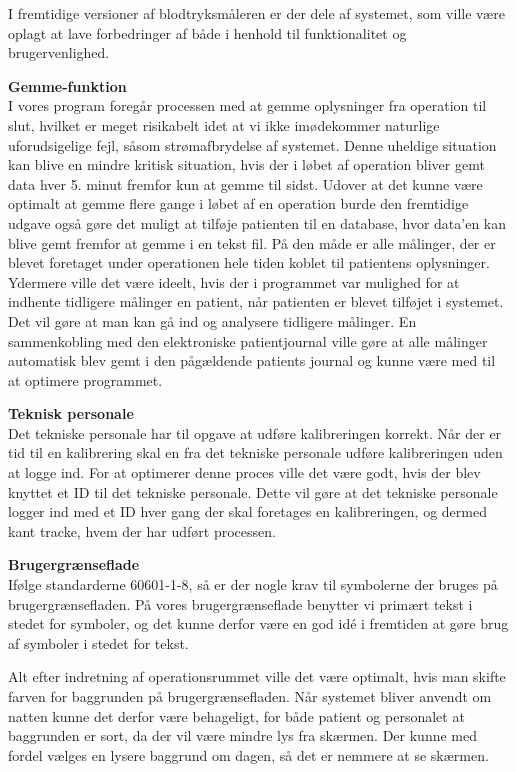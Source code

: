 I fremtidige versioner af blodtryksmåleren er der dele af systemet, som ville være oplagt at lave forbedringer af både i henhold til funktionalitet og brugervenlighed. 

\textbf{Gemme-funktion}
\\I vores program foregår processen med at gemme oplysninger fra operation til slut, hvilket er meget risikabelt idet at vi ikke imødekommer naturlige uforudsigelige fejl, såsom strømafbrydelse af systemet. Denne uheldige situation kan blive en mindre kritisk situation, hvis der i løbet af operation bliver gemt data hver 5. minut fremfor kun at gemme til sidst.
Udover at det kunne være optimalt at gemme flere gange i løbet af en operation burde den fremtidige udgave også gøre det muligt at tilføje patienten til en database, hvor data’en kan blive gemt fremfor at gemme i en tekst fil. På den måde er alle målinger, der er blevet foretaget under operationen hele tiden koblet til patientens oplysninger. Ydermere ville det være ideelt, hvis der i programmet var mulighed for at indhente tidligere målinger en patient, når patienten er blevet tilføjet i systemet. Det vil gøre at man kan gå ind og analysere tidligere målinger. En sammenkobling med den elektroniske patientjournal ville gøre at alle målinger automatisk blev gemt i den pågældende patients journal og kunne være med til at optimere programmet.

\textbf{Teknisk personale}
\\Det tekniske personale har til opgave at udføre kalibreringen korrekt. Når der er tid til en kalibrering skal en fra det tekniske personale udføre kalibreringen uden at logge ind. For at optimerer denne proces ville det være godt, hvis der blev knyttet et ID til det tekniske personale. Dette vil gøre at det tekniske personale logger ind med et ID hver gang der skal foretages en kalibreringen, og dermed kant tracke, hvem der har udført processen.

\textbf{Brugergrænseflade}
\\Ifølge standarderne 60601-1-8, så er der nogle krav til symbolerne der bruges på brugergrænsefladen. På vores brugergrænseflade benytter vi primært tekst i stedet for symboler, og det kunne derfor være en god idé i fremtiden at gøre brug af symboler i stedet for tekst.

Alt efter indretning af operationsrummet ville det være optimalt, hvis man skifte farven for baggrunden på brugergrænsefladen. Når systemet bliver anvendt om natten kunne det derfor være behageligt, for både patient og personalet at baggrunden er sort, da der vil være mindre lys fra skærmen. Der kunne med fordel vælges en lysere baggrund om dagen, så det er nemmere at se skærmen.


